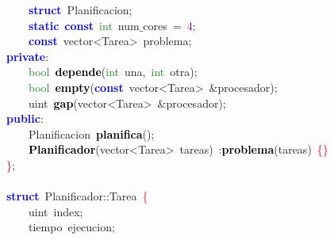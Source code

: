 \mbox{}\ \ \ \ \textbf{\textcolor{Blue}{struct}}\ \textcolor{TealBlue}{Planificacion}\textcolor{BrickRed}{;} \\
\mbox{}\ \ \ \ \textbf{\textcolor{Blue}{static}}\ \textbf{\textcolor{Blue}{const}}\ \textcolor{ForestGreen}{int}\ num$\_$cores\ \textcolor{BrickRed}{=}\ \textcolor{Purple}{4}\textcolor{BrickRed}{;} \\
\mbox{}\ \ \ \ \textbf{\textcolor{Blue}{const}}\ \textcolor{TealBlue}{vector\textless{}Tarea\textgreater{}}\ problema\textcolor{BrickRed}{;} \\
\mbox{}\textbf{\textcolor{Blue}{private}}\textcolor{BrickRed}{:} \\
\mbox{}\ \ \ \ \textcolor{ForestGreen}{bool}\ \textbf{\textcolor{Black}{depende}}\textcolor{BrickRed}{(}\textcolor{ForestGreen}{int}\ una\textcolor{BrickRed}{,}\ \textcolor{ForestGreen}{int}\ otra\textcolor{BrickRed}{);} \\
\mbox{}\ \ \ \ \textcolor{ForestGreen}{bool}\ \textbf{\textcolor{Black}{empty}}\textcolor{BrickRed}{(}\textbf{\textcolor{Blue}{const}}\ \textcolor{TealBlue}{vector\textless{}Tarea\textgreater{}}\ \textcolor{BrickRed}{\&}procesador\textcolor{BrickRed}{);} \\
\mbox{}\ \ \ \ \textcolor{TealBlue}{uint}\ \textbf{\textcolor{Black}{gap}}\textcolor{BrickRed}{(}\textcolor{TealBlue}{vector\textless{}Tarea\textgreater{}}\ \textcolor{BrickRed}{\&}procesador\textcolor{BrickRed}{);} \\
\mbox{}\textbf{\textcolor{Blue}{public}}\textcolor{BrickRed}{:} \\
\mbox{}\ \ \ \ \textcolor{TealBlue}{Planificacion}\ \textbf{\textcolor{Black}{planifica}}\textcolor{BrickRed}{();} \\
\mbox{}\ \ \ \ \textbf{\textcolor{Black}{Planificador}}\textcolor{BrickRed}{(}\textcolor{TealBlue}{vector\textless{}Tarea\textgreater{}}\ tareas\textcolor{BrickRed}{)}\ \textcolor{BrickRed}{:}\textbf{\textcolor{Black}{problema}}\textcolor{BrickRed}{(}tareas\textcolor{BrickRed}{)}\ \textcolor{Red}{\{\}} \\
\mbox{}\textcolor{Red}{\}}\textcolor{BrickRed}{;} \\
\mbox{} \\
\mbox{}\textbf{\textcolor{Blue}{struct}}\ \textcolor{TealBlue}{Planificador}\textcolor{BrickRed}{::}Tarea\ \textcolor{Red}{\{} \\
\mbox{}\ \ \ \ \textcolor{TealBlue}{uint}\ index\textcolor{BrickRed}{;} \\
\mbox{}\ \ \ \ \textcolor{TealBlue}{tiempo}\ ejecucion\textcolor{BrickRed}{;} \\
